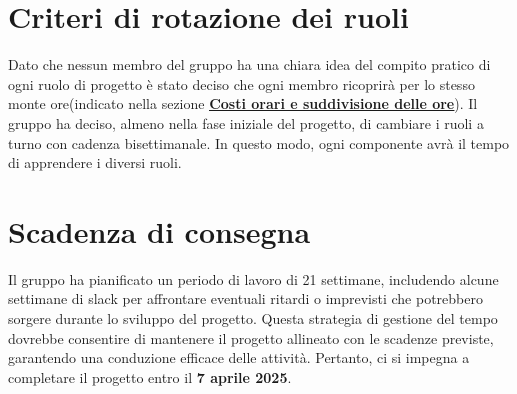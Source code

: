 \documentclass[a4paper, 12pt]{article}
\begin{document}
\section{Criteri di rotazione dei ruoli}
\label{sec:crit}
Dato che nessun membro del gruppo ha una chiara idea del compito pratico di ogni ruolo di progetto è stato deciso che ogni membro ricoprirà per lo stesso monte ore(indicato nella sezione \hyperref[tab:ore]{\textbf{\underline{Costi orari e suddivisione delle ore}}}).
Il gruppo ha deciso, almeno nella fase iniziale del progetto, di cambiare i ruoli a turno con cadenza bisettimanale. In questo modo, ogni componente avrà il tempo di apprendere i diversi ruoli.

\section{Scadenza di consegna}
\label{sec:scad}
Il gruppo ha pianificato un periodo di lavoro di 21 settimane, includendo alcune settimane di slack per affrontare eventuali ritardi o imprevisti che potrebbero sorgere durante lo sviluppo del progetto.
Questa strategia di gestione del tempo dovrebbe consentire di mantenere il progetto allineato con le scadenze previste, garantendo una conduzione efficace delle attività.
Pertanto, ci si impegna a completare il progetto entro il \textbf{7 aprile 2025}.
\end{document}
